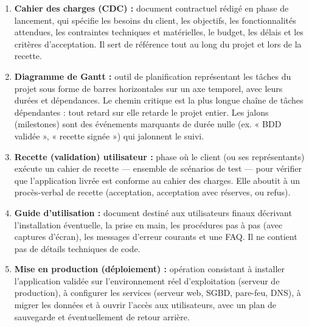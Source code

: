 \documentclass[11pt]{article}
\newcommand{\cle}[1]{{\popxbold\color{popdark}#1}}
\begin{document}
\begin{corrige}
\begin{enumerate}
    \item \textbf{Cahier des charges (CDC) :} document contractuel rédigé en phase de lancement, qui spécifie les besoins du client, les objectifs, les fonctionnalités attendues, les contraintes techniques et matérielles, le budget, les délais et les critères d'acceptation. Il sert de référence tout au long du projet et lors de la recette.
    \item \textbf{Diagramme de Gantt :} outil de planification représentant les tâches du projet sous forme de barres horizontales sur un axe temporel, avec leurs durées et dépendances. Le \cle{chemin critique} est la plus longue chaîne de tâches dépendantes : tout retard sur elle retarde le projet entier. Les \cle{jalons} (milestones) sont des événements marquants de durée nulle (ex. « BDD validée », « recette signée ») qui jalonnent le suivi.
    \item \textbf{Recette (validation) utilisateur :} phase où le client (ou ses représentants) exécute un cahier de recette --- ensemble de scénarios de test --- pour vérifier que l'application livrée est conforme au cahier des charges. Elle aboutit à un procès-verbal de recette (acceptation, acceptation avec réserves, ou refus).
    \item \textbf{Guide d'utilisation :} document destiné aux utilisateurs finaux décrivant l'installation éventuelle, la prise en main, les procédures pas à pas (avec captures d'écran), les messages d'erreur courants et une FAQ. Il ne contient pas de détails techniques de code.
    \item \textbf{Mise en production (déploiement) :} opération consistant à installer l'application validée sur l'environnement réel d'exploitation (serveur de production), à configurer les services (serveur web, SGBD, pare-feu, DNS), à migrer les données et à ouvrir l'accès aux utilisateurs, avec un plan de sauvegarde et éventuellement de retour arrière.
\end{enumerate}
\end{corrige}
\end{document}
